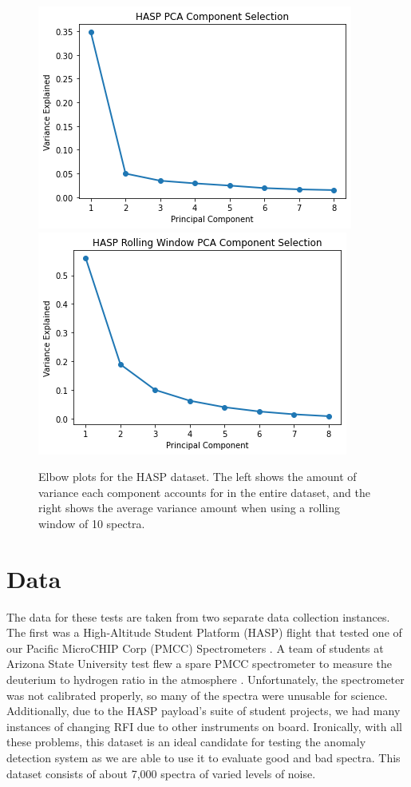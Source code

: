 \begin{figure}[b]
    \centering
    \includegraphics[width=0.49\linewidth]{figs/spectra/HASP_Elbow.png}
    \includegraphics[width=0.49\linewidth]{figs/spectra/elbow.png}
    \caption[Elbow Plots for PCA Component Selection with HASP Data]{Elbow plots for the HASP dataset. The left shows the amount of variance each component accounts for in the entire dataset, and the right shows the average variance amount when using a rolling window of 10 spectra.}
    \label{spectra/fig:elbows}
\end{figure}

\section{Data}
\label{spectra/sec:data}
The data for these tests are taken from two separate data collection instances. 
The first was a High-Altitude Student Platform (HASP) flight \parencite{guzik2008development} that tested one of our Pacific MicroCHIP Corp (PMCC) Spectrometers  \parencite{mohammed2024digital}.
A team of students at Arizona State University test flew a spare PMCC spectrometer to measure the deuterium to hydrogen ratio in the atmosphere \parencite{HADHR}.
Unfortunately, the spectrometer was not calibrated properly, so many of the spectra were unusable for science. 
Additionally, due to the HASP payload's suite of student projects, we had many instances of changing RFI due to other instruments on board. 
Ironically, with all these problems, this dataset is an ideal candidate for testing the anomaly detection system as we are able to use it to evaluate good and bad spectra. 
This dataset consists of about 7,000 spectra of varied levels of noise. 


